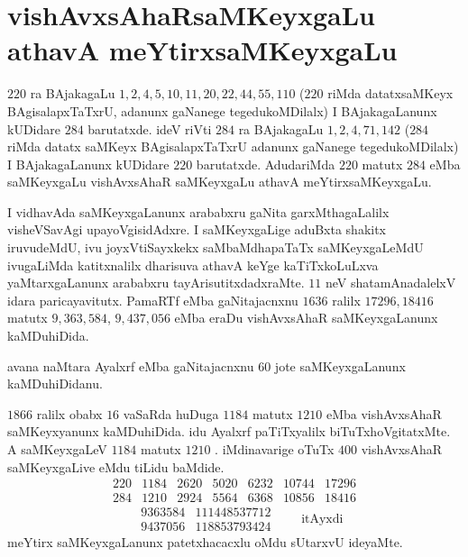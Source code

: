 \chapter{vishAvxsAhaRsaMKeyxgaLu athavA meYtirxsaMKeyxgaLu}
\vskip -20pt

$220$ ra BAjakagaLu $1,2,4,5,10,11,20,22,44,55,110$ ($220$ riMda datatxsaMKeyx BAgisalapxTaTxrU, adanunx gaNanege tegedukoMDilalx) I BAjakagaLanunx kUDidare $284$ barutatxde. ideV riVti $284$ ra BAjakagaLu $1,2,4,71,142$ ($284$ riMda datatx saMKeyx BAgisalapxTaTxrU adanunx gaNanege tegedukoMDilalx) I BAjakagaLanunx kUDidare $220$ barutatxde. AdudariMda $220$ matutx $284$ eMba saMKeyxgaLu vishAvxsAhaR saMKeyxgaLu athavA meYtirxsaMKeyxgaLu.

I vidhavAda saMKeyxgaLanunx arababxru gaNita garxMthagaLalilx visheVSavAgi upayoVgisi\-dAdxre. I saMKeyxgaLige aduBxta shakitx iruvudeMdU, ivu joyxVtiSayxkekx saMbaMdhapaTaTx saMKeyxgaLeMdU ivugaLiMda katitxnalilx dharisuva athavA keYge kaTiTxkoLuLxva yaMtarxgaLanunx arababxru tayArisutitxdadxraMte. $11$ neV shatamAnadalelxV idara pari\-cayavitutx. PamaRTf eMba gaNitajacnxnu $1636$ ralilx $17296, 18416$ matutx $9,363,584$,  $9,437,056$  eMba eraDu vishAvxsAhaR saMKeyxgaLanunx kaMDuhiDida.

avana naMtara Ayalxrf eMba gaNitajacnxnu $60$ jote saMKeyxgaLanunx kaMDuhiDidanu.

$1866$ ralilx obabx $16$ vaSaRda huDuga $1184$ matutx $1210$ eMba vishAvxsAhaR saMKeyxyanunx kaMDuhiDida. idu Ayalxrf paTiTxyalilx biTuTxhoVgitatxMte. A saMKeyxgaLeV $1184$ matutx $1210$ . iMdinavarige oTuTx $400$ vishAvxsAhaR saMKeyxgaLive eMdu tiLidu baMdide. 
{\fontsize{10}{12}\selectfont
$$
\begin{matrix}
220 & 1184 & 2620 & 5020 & 6232 & 10744 & 17296\\ 
284 & 1210 & 2924 & 5564 & 6368 & 10856 & 18416 
\end{matrix}
$$
$$
\begin{matrix}
& 9363584 & 111448537712 \\
& 9437056 & 118853793424 
\end{matrix}
\qquad \text{itAyxdi} 
$$}
meYtirx saMKeyxgaLanunx patetxhacacxlu oMdu sUtarxvU ideyaMte.
